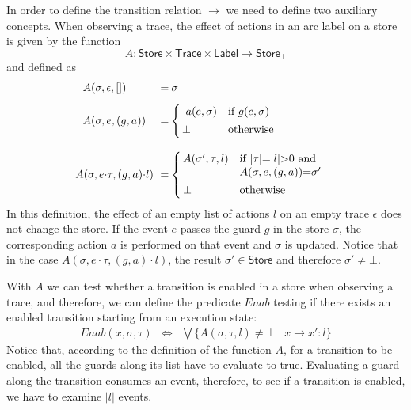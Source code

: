 \documentclass[9pt, preprint]{sigplanconf} %
\newcommand{\noterg}[2]{\textcolor{gray}{[\textcolor{red}{#1}: #2]}}
\newcommand{\rlp}[1]{\noterg{rlp}{#1}}
\newcommand{\set}[1]{\ensuremath{\mathsf{#1}}}
\theoremstyle{definition}
\theoremstyle{remark}
\begin{document}
In order to define the transition relation $\to$ we need to define two auxiliary concepts.
When observing a trace, the effect of actions in an arc label on a store  is given by the function
\[
   A : \set{Store} \times \set{Trace} \times \set{Label} \to \set{Store}_\bot
\] and defined as
\[
\begin{array}{l}
\begin{array}{l @{$\; =\;\;$} l}
A(\sigma,\epsilon,[]) &  \!\! \sigma
\\[2ex]
A(\sigma,e,(g,a)) & \!\! \left\{\begin{array}{ll}
     a(e,\sigma) & \mbox{if $g(e,\sigma)$}
     \\[1ex]
     \!\! \bot & \mbox{otherwise}
     \end{array}
     \right.
\\[5ex]
\!\!\!\!A(\sigma,e{\cdot} \tau,(g,a){\cdot} l) &  \!\! \left\{\begin{array}{ll}
    \!\! A(\sigma',\tau,l) & \mbox{if $|\tau|{=}|l|{>}0$ and }
     \\
& \mbox{$A(\sigma,e,(g,a)){=}\sigma'$}
     \\[1ex]
    \!\! \bot & \mbox{otherwise}
     \end{array}
     \right.
\end{array}
\end{array}\]
In this definition, the effect of an empty list of actions $l$ on an empty trace $\epsilon$ does not change the store.
If the event $e$ passes the guard $g$ in the store $\sigma$, the corresponding action $a$ is performed on that event 
and  $\sigma$ is updated. Notice that in  the case $A(\sigma,e\cdot \tau,(g,a)\cdot l)$, the result $\sigma' \in \set{Store}$ and therefore $\sigma' \neq \bot$. 

\newcommand{\Enabled}{\mathit{Enab}}
With $A$ we can test whether a
transition is enabled in a store when observing a trace, and therefore, we can define the
predicate $\Enabled$ testing if there exists an enabled transition
starting from an execution state:
\begin{eqnarray*}
\Enabled(x,\sigma,\tau) & \Leftrightarrow  & \bigvee \{ A(\sigma,\tau,l) \neq \bot \mid x \to x' : l \}
\end{eqnarray*}
Notice that, according to the definition of the function $A$, for a transition to be enabled, all the guards along its list have to evaluate to true.
Evaluating a guard along the transition consumes an event, therefore, to see if a transition is enabled, we have to examine $|l|$ events.
\end{document}
